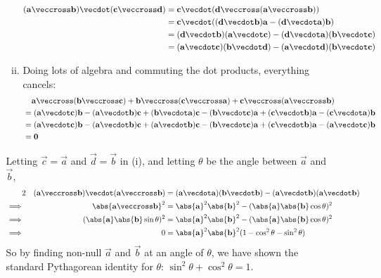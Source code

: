 \documentclass[fleqn,a4paper,11pt]{article}
\begin{document}
\begin{enumerate}
\begin{enumerate}
\begin{enumerate}[(i)]
\begin{align*}
         (\vec a \veccross \vec b) \vecdot (\vec c \veccross \vec d) &=
          \vec c \vecdot (\vec d \veccross (\vec a \veccross \vec b)) \\
          &= \vec c \vecdot ((\vec d \vecdot \vec b)\vec a
                             - (\vec d \vecdot \vec a)\vec b) \\
          &= (\vec d \vecdot \vec b)(\vec a \vecdot \vec c)
             - (\vec d \vecdot \vec a)(\vec b \vecdot \vec c) \\
          &= (\vec a \vecdot \vec c)(\vec b \vecdot \vec d)
             - (\vec a \vecdot \vec d)(\vec b \vecdot \vec c)
        \end{align*}
       \item
        Doing lots of algebra and commuting the dot products, everything
        cancels:
        \begin{align*}
         &\phantom{={}} \vec a \veccross (\vec b \veccross \vec c) +
            \vec b \veccross (\vec c \veccross \vec a) +
            \vec c \veccross (\vec a \veccross \vec b) \\
         &= (\vec a \vecdot \vec c)\vec b - (\vec a \vecdot \vec b)\vec c
           + (\vec b \vecdot \vec a)\vec c - (\vec b \vecdot \vec c)\vec a
           + (\vec c \vecdot \vec b)\vec a - (\vec c \vecdot \vec a)\vec b \\
         &= (\vec a \vecdot \vec c)\vec b - (\vec a \vecdot \vec b)\vec c
           + (\vec a \vecdot \vec b)\vec c - (\vec b \vecdot \vec c)\vec a
           + (\vec c \vecdot \vec b)\vec a - (\vec a \vecdot \vec c)\vec b \\
         &= \vec 0
        \end{align*}
      \end{enumerate}
      Letting \(\vec c = \vec a\) and \(\vec d = \vec b\) in (i), and letting
      \(\theta\) be the angle between \(\vec a\) and \(\vec b\),
      \begin{alignat*}2
       && (\vec a \veccross \vec b) \vecdot (\vec a \veccross \vec b)
        &= (\vec a \vecdot \vec a)(\vec b \vecdot \vec b)
           - (\vec a \vecdot \vec b)(\vec a \vecdot \vec b) \\
       \implies{}&&
        \abs{\vec a \veccross \vec b}^2
        &= \abs{\vec a}^2 \abs{\vec b}^2
           - (\abs{\vec a}\abs{\vec b}\cos \theta)^2 \\
       \implies{}&&
        (\abs{\vec a} \abs{\vec b} \sin \theta)^2
        &= \abs{\vec a}^2 \abs{\vec b}^2
           - (\abs{\vec a}\abs{\vec b}\cos \theta)^2 \\
       \implies{}&&
        0 &= \abs{\vec a}^2 \abs{\vec b}^2(1 - \cos^2 \theta - \sin^2 \theta)
      \end{alignat*}
      So by finding non-null \(\vec a\) and \(\vec b\) at an angle of
      \(\theta\), we have shown the standard Pythagorean identity for
      \(\theta\): \(\sin^2 \theta + \cos^2 \theta = 1\).


\end{enumerate}
\end{enumerate}
\end{document}
